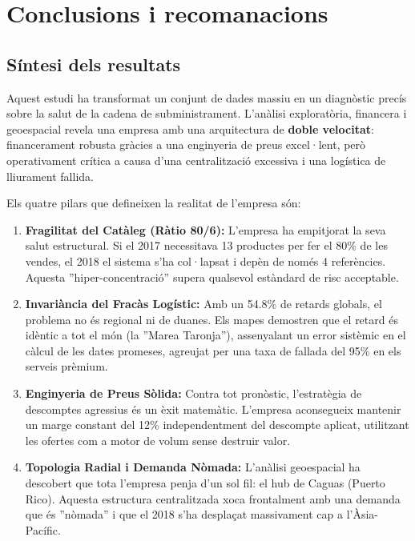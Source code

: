 \documentclass[12pt,a4paper]{article}
\begin{document}
\section{Conclusions i recomanacions}

\subsection{Síntesi dels resultats}
Aquest estudi ha transformat un conjunt de dades massiu en un diagnòstic precís sobre la salut de la cadena de subministrament. L'anàlisi exploratòria, financera i geoespacial revela una empresa amb una arquitectura de \textbf{doble velocitat}: financerament robusta gràcies a una enginyeria de preus excel·lent, però operativament crítica a causa d'una centralització excessiva i una logística de lliurament fallida.

Els quatre pilars que defineixen la realitat de l'empresa són:

\begin{enumerate}
    \item \textbf{Fragilitat del Catàleg (Ràtio 80/6):} L'empresa ha empitjorat la seva salut estructural. Si el 2017 necessitava 13 productes per fer el 80\% de les vendes, el 2018 el sistema s'ha col·lapsat i depèn de només 4 referències. Aquesta ''hiper-concentració'' supera qualsevol estàndard de risc acceptable.
    
    \item \textbf{Invariància del Fracàs Logístic:} Amb un 54.8\% de retards globals, el problema no és regional ni de duanes. Els mapes demostren que el retard és idèntic a tot el món (la ''Marea Taronja''), assenyalant un error sistèmic en el càlcul de les dates promeses, agreujat per una taxa de fallada del 95\% en els serveis prèmium.
    
    \item \textbf{Enginyeria de Preus Sòlida:} Contra tot pronòstic, l'estratègia de descomptes agressius és un èxit matemàtic. L'empresa aconsegueix mantenir un marge constant del 12\% independentment del descompte aplicat, utilitzant les ofertes com a motor de volum sense destruir valor.
    
    \item \textbf{Topologia Radial i Demanda Nòmada:} L'anàlisi geoespacial ha descobert que tota l'empresa penja d'un sol fil: el hub de Caguas (Puerto Rico). Aquesta estructura centralitzada xoca frontalment amb una demanda que és ''nòmada'' i que el 2018 s'ha desplaçat massivament cap a l'Àsia-Pacífic.
\end{enumerate}
\end{document}
